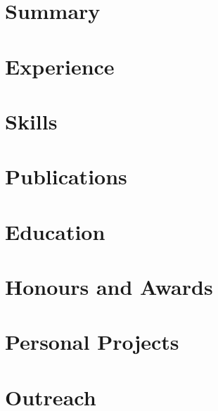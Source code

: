 \documentclass[english,a4paper,10pt]{extarticle}
\begin{document}
\pagestyle{normal_page}
\thispagestyle{first_page}

\section{Summary}


\section{Experience}


\section{Skills}


\section{Publications}


\section{Education}


\section{Honours and Awards}


\section{Personal Projects}



\section{Outreach}


\thispagestyle{last_page}

\end{document}
